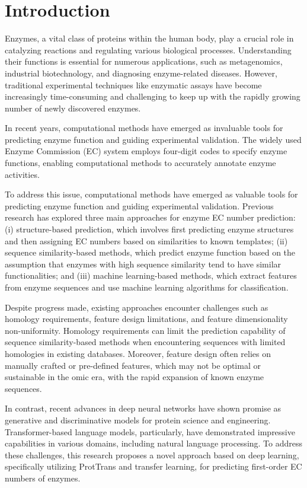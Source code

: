 \documentclass[conference]{IEEEtran}
\begin{document}
\section{Introduction}


Enzymes, a vital class of proteins within the human body, play a crucial role in catalyzing reactions and regulating various biological processes. Understanding their functions is essential for numerous applications, such as metagenomics, industrial biotechnology, and diagnosing enzyme-related diseases. However, traditional experimental techniques like enzymatic assays have become increasingly time-consuming and challenging to keep up with the rapidly growing number of newly discovered enzymes.

In recent years, computational methods have emerged as invaluable tools for predicting enzyme function and guiding experimental validation. The widely used Enzyme Commission (EC) system employs four-digit codes to specify enzyme functions, enabling computational methods to accurately annotate enzyme activities.

To address this issue, computational methods have emerged as valuable tools for predicting enzyme function and guiding experimental validation. Previous research has explored three main approaches for enzyme EC number prediction: (i) structure-based prediction, which involves first predicting enzyme structures and then assigning EC numbers based on similarities to known templates; (ii) sequence similarity-based methods, which predict enzyme function based on the assumption that enzymes with high sequence similarity tend to have similar functionalities; and (iii) machine learning-based methods, which extract features from enzyme sequences and use machine learning algorithms for classification.

Despite progress made, existing approaches encounter challenges such as homology requirements, feature design limitations, and feature dimensionality non-uniformity. Homology requirements can limit the prediction capability of sequence similarity-based methods when encountering sequences with limited homologies in existing databases. Moreover, feature design often relies on manually crafted or pre-defined features, which may not be optimal or sustainable in the omic era, with the rapid expansion of known enzyme sequences.

In contrast, recent advances in deep neural networks have shown promise as generative and discriminative models for protein science and engineering. Transformer-based language models, particularly, have demonstrated impressive capabilities in various domains, including natural language processing. To address these challenges, this research proposes a novel approach based on deep learning, specifically utilizing ProtTrans and transfer learning, for predicting first-order EC numbers of enzymes.
\end{document}
